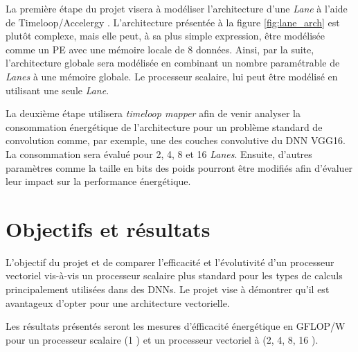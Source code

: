 \documentclass[11pt,letterpaper]{article}
\begin{document}
    La première étape du projet visera à modéliser l'architecture d'une \textit{Lane} à
    l'aide de Timeloop/Accelergy \cite{timeloop}. %
    L'architecture présentée à la figure \ref{fig:lane_arch}
    est plutôt complexe, mais elle peut, à sa plus simple expression, être modélisée comme
    un PE avec une mémoire locale de 8 données. Ainsi, par la suite, l'architecture globale
    sera modélisée en combinant un nombre paramétrable de \textit{Lanes} à une mémoire globale.
    Le processeur scalaire, lui peut être modélisé en utilisant une seule \textit{Lane}.

    La deuxième étape utilisera \textit{timeloop mapper} afin de venir analyser la consommation
    énergétique de l'architecture pour un problème standard de convolution comme, par exemple,
    une des couches convolutive du DNN VGG16. La consommation sera évalué pour 2, 4, 8 et 16 
    \textit{Lanes}. Ensuite, d'autres paramètres comme la taille en bits des poids pourront
    être modifiés afin d'évaluer leur impact sur la performance énergétique.

    

\section*{Objectifs et résultats}
    L'objectif du projet et de comparer l'efficacité et l'évolutivité d'un processeur 
    vectoriel vis-à-vis un processeur scalaire plus standard pour les types de calculs
    principalement utilisées dans des DNNs. Le projet vise à démontrer qu'il est avantageux
    d'opter pour une architecture vectorielle.

    Les résultats présentés seront les mesures d'éfficacité énergétique en GFLOP/W pour
    un processeur scalaire (1 ) et un processeur vectoriel à (2, 4, 8, 16 ).

{}
    
\end{document}
